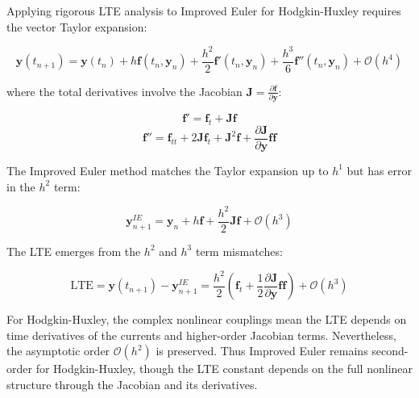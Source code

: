 Applying rigorous LTE analysis to Improved Euler for Hodgkin-Huxley requires the vector Taylor expansion:

\[
\mathbf{y}(t_{n+1}) = \mathbf{y}(t_n) + h\mathbf{f}(t_n, \mathbf{y}_n) + \frac{h^2}{2}\mathbf{f}'(t_n, \mathbf{y}_n) + \frac{h^3}{6}\mathbf{f}''(t_n, \mathbf{y}_n) + \mathcal{O}(h^4)
\]

where the total derivatives involve the Jacobian $\mathbf{J} = \frac{\partial \mathbf{f}}{\partial \mathbf{y}}$:

\[
\mathbf{f}' = \mathbf{f}_t + \mathbf{J}\mathbf{f}
\]
\[
\mathbf{f}'' = \mathbf{f}_{tt} + 2\mathbf{J}\mathbf{f}_t + \mathbf{J}^2\mathbf{f} + \frac{\partial \mathbf{J}}{\partial \mathbf{y}}\mathbf{f}\mathbf{f}
\]

The Improved Euler method matches the Taylor expansion up to $h^1$ but has error in the $h^2$ term:

\[
\mathbf{y}_{n+1}^{IE} = \mathbf{y}_n + h\mathbf{f} + \frac{h^2}{2}\mathbf{J}\mathbf{f} + \mathcal{O}(h^3)
\]

The LTE emerges from the $h^2$ and $h^3$ term mismatches:

\[
\text{LTE} = \mathbf{y}(t_{n+1}) - \mathbf{y}_{n+1}^{IE} = \frac{h^2}{2}(\mathbf{f}_t + \frac{1}{2}\frac{\partial \mathbf{J}}{\partial \mathbf{y}}\mathbf{f}\mathbf{f}) + \mathcal{O}(h^3)
\]

For Hodgkin-Huxley, the complex nonlinear couplings mean the LTE depends on time derivatives of the currents and higher-order Jacobian terms. Nevertheless, the asymptotic order $\mathcal{O}(h^2)$ is preserved.
Thus Improved Euler remains second-order for Hodgkin-Huxley, though the LTE constant depends on the full nonlinear structure through the Jacobian and its derivatives.